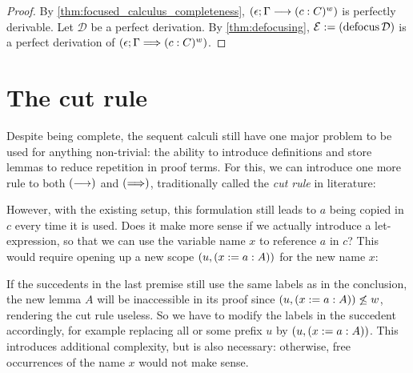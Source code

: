 \documentclass[twoside]{report}
\begin{document}
\begin{proof}
By \cref{thm:focused_calculus_completeness}, $(\epsilon; \Gamma \vdashf (c : C)^w)$ is perfectly derivable. Let $\mathcal D$ be a perfect derivation. By \cref{thm:defocusing}, $\mathcal E \defeq (\defocus \mathcal D)$ is a perfect derivation of $(\epsilon; \Gamma \vdashs (c : C)^w)$.
\end{proof}

\section{The cut rule}
\label{sec:sequent_calculi_cut_rule}

Despite being complete, the sequent calculi still have one major problem to be used for anything non-trivial: the ability to introduce definitions and store lemmas to reduce repetition in proof terms. For this, we can introduce one more rule to both $(\vdashf)$ and $(\vdashs)$, traditionally called the \emph{cut rule} in literature:

\begin{prooftree}
\end{prooftree}

However, with the existing setup, this formulation still leads to $a$ being copied in $c$ every time it is used. Does it make more sense if we actually introduce a let-expression, so that we can use the variable name $x$ to reference $a$ in $c$? This would require opening up a new scope $(u, (x \defeq a : A))$ for the new name $x$:

\begin{prooftree}
\end{prooftree}

If the succedents in the last premise still use the same labels as in the conclusion, the new lemma $A$ will be inaccessible in its proof since $(u, (x \defeq a : A)) \not\leq w$, rendering the cut rule useless. So we have to modify the labels in the succedent accordingly, for example replacing all or some prefix $u$ by $(u, (x \defeq a : A))$. This introduces additional complexity, but is also necessary: otherwise, free occurrences of the name $x$ would not make sense.
\end{document}
